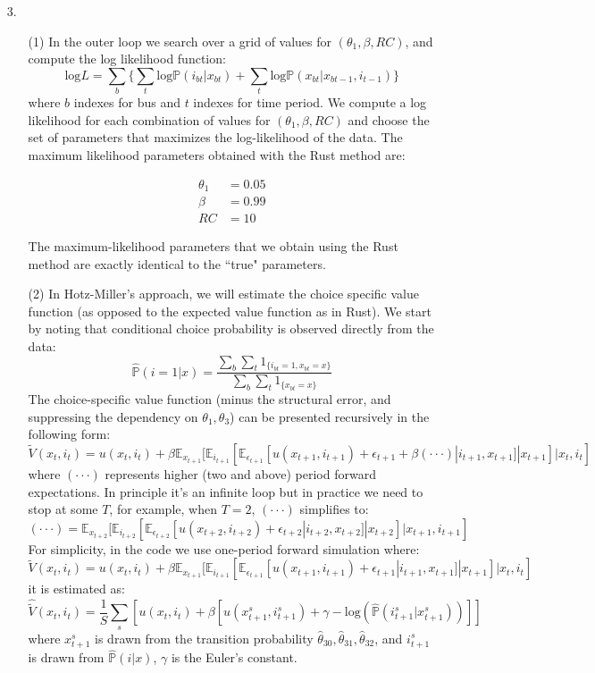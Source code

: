 \documentclass[paper=a4, fontsize=11pt]{scrartcl} %
\numberwithin{equation}{section} %
\numberwithin{figure}{section} %
\numberwithin{table}{section} %
\begin{document}
\begin{itemize}
\begin{itemize}
\end{itemize}

\item[3.]
\begin{itemize}
\item[(1)] In the outer loop we search over a grid of values for $(\theta_1, \beta, RC)$, and compute the log likelihood function:
\[\text{log}L = \sum_{b} \{\sum_{t} \text{log} \mathbb{P}(i_{bt}|x_{bt}) + \sum_t \text{log} \mathbb{P}(x_{bt}|x_{bt-1},i_{t-1})\}\]
where $b$ indexes for bus and $t$ indexes for time period. We compute a log likelihood for each combination of values for $(\theta_1, \beta, RC)$ and choose the set of parameters that maximizes the log-likelihood of the data. The maximum likelihood parameters obtained with the Rust method are:

\begin{eqnarray*}
\theta_1 & = 0.05 \\
\beta & = 0.99 \\
RC & = 10
\end{eqnarray*}

The maximum-likelihood parameters that we obtain using the Rust method are exactly identical to the ``true" parameters.

\item[(2)] In Hotz-Miller's approach, we will estimate the choice specific value function (as opposed to the expected value function as in Rust). We start by noting that conditional choice probability is observed directly from the data:
\[\hat{\mathbb{P}}(i=1|x) = \frac{\sum_{b}\sum_{t} 1_{\{i_{bt}=1, x_{bt}=x\}}}{\sum_{b}\sum_{t} 1_{\{x_{bt}=x\}}}\]
The choice-specific value function (minus the structural error, and suppressing the dependency on $\theta_1, \theta_3$) can be presented recursively in the following form:
\[\tilde{V}(x_t,i_t) = u(x_t,i_t)+\beta\mathbb{E}_{x_{t+1}}[\mathbb{E}_{i_{t+1}}[\mathbb{E}_{\epsilon_{t+1}}[u(x_{t+1},i_{t+1})+\epsilon_{t+1}+\beta(\cdot\cdot\cdot)|i_{t+1},x_{t+1}]|x_{t+1}]|x_t,i_t]\]
where $(\cdot\cdot\cdot)$ represents higher (two and above) period forward expectations. In principle it's an infinite loop but in practice we need to stop at some $T$, for example, when $T=2$, $(\cdot\cdot\cdot)$ simplifies to:
\[(\cdot\cdot\cdot) = \mathbb{E}_{x_{t+2}}[\mathbb{E}_{i_{t+2}}[\mathbb{E}_{\epsilon_{t+2}}[u(x_{t+2},i_{t+2})+\epsilon_{t+2}|i_{t+2},x_{t+2}]|x_{t+2}]|x_{t+1},i_{t+1}]\]
For simplicity, in the code we use one-period forward simulation where:
\[\tilde{V}(x_t,i_t) = u(x_t,i_t)+\beta\mathbb{E}_{x_{t+1}}[\mathbb{E}_{i_{t+1}}[\mathbb{E}_{\epsilon_{t+1}}[u(x_{t+1},i_{t+1})+\epsilon_{t+1}|i_{t+1},x_{t+1}]|x_{t+1}]|x_t,i_t]\]
it is estimated as:
\[\hat{\tilde{V}}(x_t,i_t) = \frac{1}{S} \sum_{s} [u(x_t,i_t)+\beta[u(x^s_{t+1},i^s_{t+1})+\gamma -\text{log}(\hat{\mathbb{P}}(i^s_{t+1}|x^s_{t+1}))]]\]
where $x^s_{t+1}$ is drawn from the transition probability $\hat{\theta}_{30}, \hat{\theta}_{31}, \hat{\theta}_{32}$, and $i^s_{t+1}$ is drawn from $\hat{\mathbb{P}}(i|x)$, $\gamma$ is the Euler's constant. 


\end{itemize}
\end{itemize}
\end{document}
